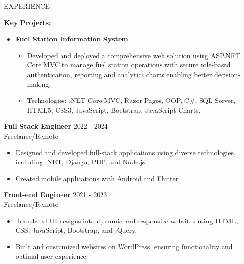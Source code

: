 \documentclass{resume} %
\begin{document}
\begin{rSection}{EXPERIENCE}
		\item 
		\textbf{Key Projects:}
		\begin{itemize}
			\itemsep -3pt {} 
			\item \textbf{Fuel Station Information System}
			
			\begin{itemize}
				\itemsep -3pt {} 
				\item Developed and deployed a comprehensive web solution using ASP.NET Core MVC to manage fuel station operations with secure role-based authentication, reporting and analytics charts enabling better decision-making.

				\item Technologies: .NET Core MVC, Razor Pages, OOP, C\#, SQL Server, HTML5, CSS3, JavaScript, Bootstrap, JavaScript Charts.
			\end{itemize}
		\end{itemize}
	
		 
	
	\textbf{Full Stack Engineer} \hfill 2022 - 2024\\
	Freelance/Remote %
	\begin{itemize}
		\itemsep -3pt {} 
		\item Designed and developed full-stack applications using diverse technologies, including .NET, Django, PHP, and Node.js.
		\item Created mobile applications with Android and Flutter
	\end{itemize}
	
	
	\textbf{Front-end Engineer} \hfill 2021  - 2023\\
	Freelance/Remote  \hfill %
	\begin{itemize}
		\itemsep -3pt {} 
		\item Translated UI designs into dynamic and responsive websites using HTML, CSS, JavaScript, Bootstrap, and jQuery.
		
		\item Built and customized websites on WordPress, ensuring functionality and optimal user experience. \\
		
	\end{itemize}
	
	
	


\end{rSection}
\end{document}
